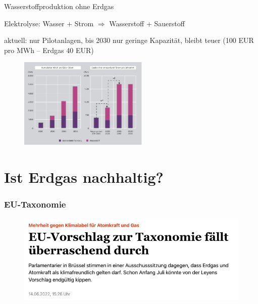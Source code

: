 \documentclass[10pt]{beamer}
\begin{document}
\begin{frame}{Wasserstoffproduktion ohne Erdgas}
  \begin{small}
  Elektrolyse: Wasser + Strom $\Rightarrow$ Wasserstoff + Sauerstoff

  aktuell: nur Pilotanlagen, bis 2030 nur geringe Kapazität, bleibt teuer (100 EUR pro MWh -- Erdgas 40 EUR)
  \end{small}


  \begin{figure}
    \includegraphics[width=0.55\textwidth]{fig/wasserstoff-strombedarf.png}

    \scriptsize{}
  \end{figure}
\end{frame}


\part{Ist Erdgas nachhaltig?}
\frame{\partpage}

\section{EU-Taxonomie}

\begin{frame}
\begin{figure}
\includegraphics[width=\textwidth]{fig/headline-taxonomie.png}

\scriptsize{}
\end{figure}
\end{frame}
\end{document}
